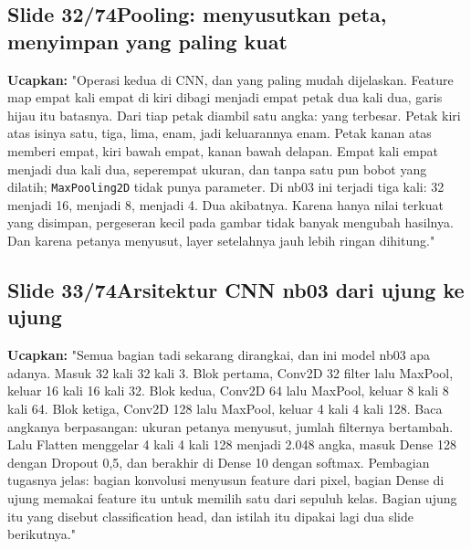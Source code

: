 \documentclass[11pt]{article}
\renewcommand{\framebox}[1]{\colorbox{acc!15}{\textcolor{acc}{\textbf{#1}}}}
\begin{document}
\subsection*{\framebox{Slide 32/74}\quad Pooling: menyusutkan peta, menyimpan yang paling kuat}
\textbf{Ucapkan:} "Operasi kedua di CNN, dan yang paling mudah dijelaskan. Feature map empat kali empat di kiri dibagi menjadi empat petak dua kali dua, garis hijau itu batasnya. Dari tiap petak diambil satu angka: yang terbesar. Petak kiri atas isinya satu, tiga, lima, enam, jadi keluarannya enam. Petak kanan atas memberi empat, kiri bawah empat, kanan bawah delapan. Empat kali empat menjadi dua kali dua, seperempat ukuran, dan tanpa satu pun bobot yang dilatih; \texttt{MaxPooling2D} tidak punya parameter. Di nb03 ini terjadi tiga kali: 32 menjadi 16, menjadi 8, menjadi 4. Dua akibatnya. Karena hanya nilai terkuat yang disimpan, pergeseran kecil pada gambar tidak banyak mengubah hasilnya. Dan karena petanya menyusut, layer setelahnya jauh lebih ringan dihitung."\\[2pt]

\subsection*{\framebox{Slide 33/74}\quad Arsitektur CNN nb03 dari ujung ke ujung}
\textbf{Ucapkan:} "Semua bagian tadi sekarang dirangkai, dan ini model nb03 apa adanya. Masuk 32 kali 32 kali 3. Blok pertama, Conv2D 32 filter lalu MaxPool, keluar 16 kali 16 kali 32. Blok kedua, Conv2D 64 lalu MaxPool, keluar 8 kali 8 kali 64. Blok ketiga, Conv2D 128 lalu MaxPool, keluar 4 kali 4 kali 128. Baca angkanya berpasangan: ukuran petanya menyusut, jumlah filternya bertambah. Lalu Flatten menggelar 4 kali 4 kali 128 menjadi 2.048 angka, masuk Dense 128 dengan Dropout 0,5, dan berakhir di Dense 10 dengan softmax. Pembagian tugasnya jelas: bagian konvolusi menyusun feature dari pixel, bagian Dense di ujung memakai feature itu untuk memilih satu dari sepuluh kelas. Bagian ujung itu yang disebut classification head, dan istilah itu dipakai lagi dua slide berikutnya."\\[2pt]
\end{document}
